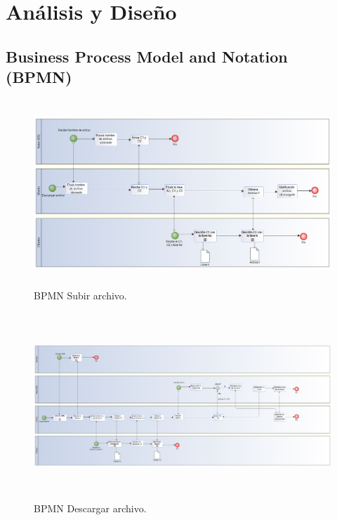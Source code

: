 \chapter{An\'alisis y Dise\~no} %

\section{Business Process Model and Notation (BPMN)}


\begin{figure}[H]
\centering
	\includegraphics[width=16cm, height=7cm]{./images/bp_descargar.png}
	\caption{BPMN Subir archivo.}

\end{figure}

\begin{figure}[H]
\centering
	\includegraphics[width=16cm, height=7cm]{./images/bp_subir.png}
	\caption{BPMN Descargar archivo.}

\end{figure}


